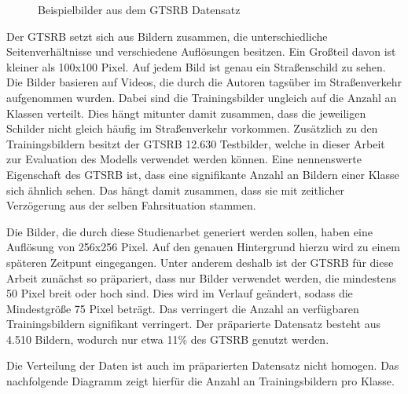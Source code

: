 \begin{figure}[H]
\begin{subfigure}[b]{0.125\textwidth}
    \caption{}
    \label{fig:gtrsb-paper-bsp-image-4}
\end{subfigure}
      \caption{Beispielbilder aus dem \acs{GTSRB} Datensatz \cite{GTSRB}}
      \label{fig:gtrsb-paper-bsp-images}
\end{figure}

Der \ac{GTSRB} setzt sich aus Bildern zusammen, die unterschiedliche Seitenverhältnisse und verschiedene Auflösungen besitzen. Ein Großteil davon ist kleiner als 100x100 Pixel. Auf jedem Bild ist genau ein Straßenschild zu sehen. Die Bilder basieren auf Videos, die durch die Autoren tagsüber im Straßenverkehr aufgenommen wurden. Dabei sind die Trainingsbilder ungleich auf die Anzahl an Klassen verteilt. Dies hängt mitunter damit zusammen, dass die jeweiligen Schilder nicht gleich häufig im Straßenverkehr vorkommen. Zusätzlich zu den Trainingsbildern besitzt der \ac{GTSRB} 12.630 Testbilder, welche in dieser Arbeit zur Evaluation des Modells verwendet werden können. Eine nennenswerte Eigenschaft des \ac{GTSRB} ist, dass eine signifikante Anzahl an Bildern einer Klasse sich ähnlich sehen. Das hängt damit zusammen, dass sie mit zeitlicher Verzögerung aus der selben Fahrsituation stammen. \cite{GTSRB}

Die Bilder, die durch diese Studienarbet generiert werden sollen, haben eine Auflösung von 256x256 Pixel. Auf den genauen Hintergrund hierzu wird zu einem späteren Zeitpunt eingegangen. Unter anderem deshalb ist der \ac{GTSRB} für diese Arbeit zunächst so präpariert, dass nur Bilder verwendet werden, die mindestens 50 Pixel breit oder hoch sind. Dies wird im Verlauf geändert, sodass die Mindestgröße 75 Pixel beträgt. Das verringert die Anzahl an verfügbaren Trainingsbildern signifikant verringert. Der präparierte Datensatz besteht aus 4.510 Bildern, wodurch nur etwa 11\% des \ac{GTSRB} genutzt werden.

Die Verteilung der Daten ist auch im präparierten Datensatz nicht homogen. Das nachfolgende Diagramm zeigt hierfür die Anzahl an Trainingsbildern pro Klasse.




